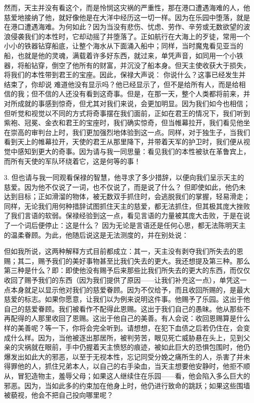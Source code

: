 然而，天主并没有看这个，而是怜悯这灾祸的严重性，那在港口遭遇海难的人，他慈爱地接纳了他，就好像他是在大洋中经历这一切一样。因为在乐园中堕落，就是在港口遭遇海难。为何如此？因为当没有悲伤、忧虑、劳作、辛劳或无数欲望的波浪侵袭我们的本性时，它却动摇了并堕落了。正如航行在大海上的歹徒，常用一个小小的铁器钻穿船底，让整个海水从下面涌入船中；同样，当时魔鬼看见亚当的船，也就是他的灵魂，满载着许多好东西，就过来，单凭声音，如同用一个小铁器，将船钻穿，倒空了他所有的财富，并沉没了船本身。但天主使收获大于损失，将我们的本性带到君王的宝座。因此，保禄大声说： 你说什么？这事已经发生并结束了，你却说  难道他没有显示吗？他已经显示了，但不是给所有人，而是给相信的我；但不信的人还没有看到这奇事。但是，在那一天，整个人类都将前来，并对所成就的事感到惊奇，但尤其对我们来说，会更加明显。因为我们如今也相信；但听觉和视觉以不同的方式将奇事摆在我们面前，正如在君王的情况下，我们听到紫袍、冠冕、金衣和君王的宝座时，我们确实惊奇，但当帷幕拉开，我们看见他坐在崇高的审判台上时，我们更加强烈地体验到这一点。同样，对于独生子，当我们看到天上的帷幕拉开，天使的君王从那里降下，并带着天军的护卫时，我们便从视觉中感知到更大的奇事。因为请与我一同思量：看见我们的本性被驮在革鲁宾上，而所有天使的军队环绕着它，这是何等的事！\par

3. 但也请与我一同观看保禄的智慧，他寻求了多少措辞，以便向我们呈示天主的慈爱。因为他不仅说了一词，也不仅说了，而是说了什么？ 但即使如此，他仍未达到目标；正如滑溜的物体，被无数双手抓住时，会逃脱我们的掌握，轻易滑走；同样，无论我们用何种措辞试图抓住天主的慈爱，都无法抓住，但其极其庞大挫败了我们言语的软弱。保禄经验到这一点，看见言语的力量被其庞大击败，于是在说了一个词后便停止：这是什么？ 因为无论是言语还是任何心思，都无法陈明天主的温柔眷顾。为此，他随后说这是无法测度的，并在别处说：\par

但如我所说，这两种解释方式目前都成立：其一，天主没有剥夺我们所失去的恩赐；其二，赐予我们的美好事物甚至比我们失去的更大。我还想提及第三种。那么第三种是什么？即：即使他没有赐予后来那些比我们所失去的更大的东西，而仅仅收回了赐予我们的东西（因为我们提供了原因——让我们补充这一点），单凭这一点本身就足以显示他对我们的慈爱眷顾。因为不仅给予，而且收回所赐的，是最大慈爱的标志。如果你愿意，让我们以为例来说明这件事。他赐予了乐园。这出于他自己的慈爱眷顾。我们被看作不配得此恩赐。这出于我们自己的愚昧。他从那些不再配得的人那里收回了恩赐。这出于他自己的美善。有人会说：收回恩赐算是什么样的美善呢？等一下，你将会完全听到。请想想，在犯下血债之后若仍住在，会变成什么样。因为，当他被逐出那居所，被判劳苦，眼见死亡威胁悬在头上，见到父亲的灾祸就在眼前，手中仍握着天主愤怒的痕迹，被如此巨大的恐惧包围时，他仍爆发出如此大的邪恶，以至于无视本性，忘记同受分娩之痛所生的人，杀害了并未得罪他的人，抓住兄弟本人，以自己的右手染血，当天主想要他安静时，他拒不顺从，冒犯造物主，羞辱父母；如果这人继续住在乐园——看，他会陷入多么巨大的邪恶。因为，当如此多的约束加在他身上时，他仍进行致命的跳跃；如果这些围墙被藐视，他会不把自己投向哪里呢？\par

